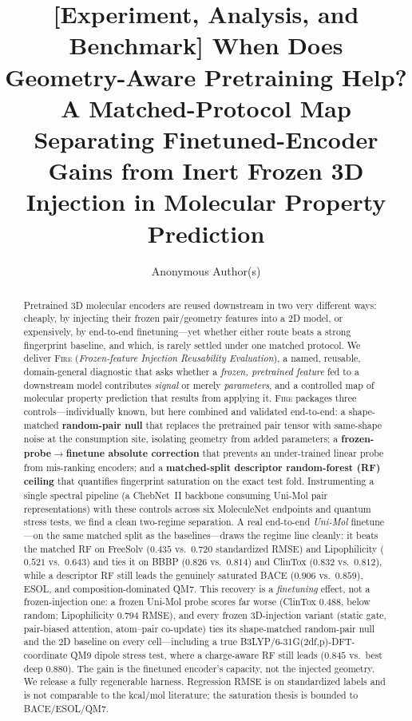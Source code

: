 \documentclass[sigconf,nonacm,anonymous,review]{acmart}
\begin{document}
\title{[Experiment, Analysis, and Benchmark] When Does Geometry-Aware Pretraining Help? A Matched-Protocol Map Separating Finetuned-Encoder Gains from Inert Frozen 3D Injection in Molecular Property Prediction}
\author{Anonymous Author(s)}

\begin{abstract}
Pretrained 3D molecular encoders are reused downstream in two very different ways: cheaply, by injecting their frozen pair/geometry features into a 2D model, or expensively, by end-to-end finetuning---yet whether either route beats a strong fingerprint baseline, and which, is rarely settled under one matched protocol. We deliver \textsc{Fire} (\emph{Frozen-feature Injection Reusability Evaluation}), a named, reusable, domain-general diagnostic that asks whether a \emph{frozen, pretrained feature} fed to a downstream model contributes \emph{signal} or merely \emph{parameters}, and a controlled map of molecular property prediction that results from applying it. \textsc{Fire} packages three controls---individually known, but here combined and validated end-to-end: a shape-matched \textbf{random-pair null} that replaces the pretrained pair tensor with same-shape noise at the consumption site, isolating geometry from added parameters; a \textbf{frozen-probe$\rightarrow$finetune absolute correction} that prevents an under-trained linear probe from mis-ranking encoders; and a \textbf{matched-split descriptor random-forest (RF) ceiling} that quantifies fingerprint saturation on the exact test fold. Instrumenting a single spectral pipeline (a ChebNet~II backbone consuming Uni-Mol pair representations) with these controls across six MoleculeNet endpoints and quantum stress tests, we find a clean two-regime separation. A real end-to-end \emph{Uni-Mol} finetune---on the same matched split as the baselines---draws the regime line cleanly: it beats the matched RF on FreeSolv ($0.435$ vs.\ $0.720$ standardized RMSE) and Lipophilicity ($0.521$ vs.\ $0.643$) and ties it on BBBP ($0.826$ vs.\ $0.814$) and ClinTox ($0.832$ vs.\ $0.812$), while a descriptor RF still leads the genuinely saturated BACE ($0.906$ vs.\ $0.859$), ESOL, and composition-dominated QM7. This recovery is a \emph{finetuning} effect, not a frozen-injection one: a frozen Uni-Mol probe scores far worse (ClinTox $0.488$, below random; Lipophilicity $0.794$ RMSE), and every frozen 3D-injection variant (static gate, pair-biased attention, atom--pair co-update) ties its shape-matched random-pair null and the 2D baseline on every cell---including a true B3LYP/6-31G(2df,p)-DFT-coordinate QM9 dipole stress test, where a charge-aware RF still leads ($0.845$ vs.\ best deep $0.880$). The gain is the finetuned encoder's capacity, not the injected geometry. We release a fully regenerable harness. Regression RMSE is on standardized labels and is not comparable to the kcal/mol literature; the saturation thesis is bounded to BACE/ESOL/QM7.
\end{abstract}
\end{document}
